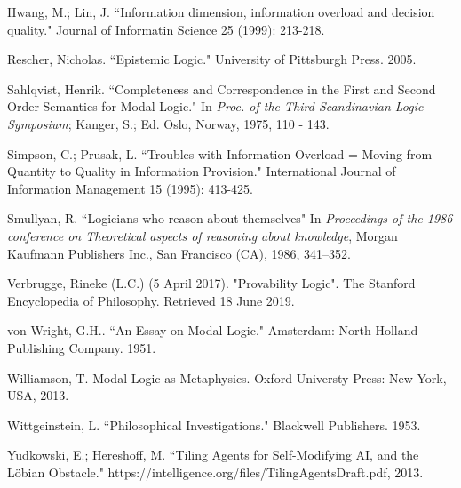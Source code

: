 \begin{thebibliography}{9}
	 	Hwang, M.; Lin, J. ``Information dimension, information overload and decision quality." Journal of Informatin Science 25 (1999): 213-218.
	 	
	 	Rescher, Nicholas. ``Epistemic Logic." University of Pittsburgh Press. 2005.
	 	
	 	Sahlqvist, Henrik. ``Completeness and Correspondence in the First and Second Order Semantics for Modal Logic." In {\em Proc. of the Third Scandinavian Logic Symposium}; Kanger, S.; Ed. Oslo, Norway, 1975, 110 - 143.
	 	
	 	Simpson, C.; Prusak, L. ``Troubles with Information Overload = Moving from Quantity to Quality in Information Provision." International Journal of Information Management 15 (1995): 413-425.
	 	
	 	Smullyan, R. ``Logicians who reason about themselves" In \emph{Proceedings of the 1986 conference on Theoretical aspects of reasoning about knowledge}, Morgan Kaufmann Publishers Inc., San Francisco (CA), 1986, 341–352.
	 	
	 	Verbrugge, Rineke (L.C.) (5 April 2017). "Provability Logic". The Stanford Encyclopedia of Philosophy. Retrieved 18 June 2019.
	 	
	 	von Wright, G.H.. ``An Essay on Modal Logic." Amsterdam: North-Holland Publishing Company. 1951.
	 	
	 	Williamson, T. Modal Logic as Metaphysics. Oxford Universty Press: New York, USA, 2013.
	 	
	 	Wittgeinstein, L. ``Philosophical Investigations." Blackwell Publishers. 1953.
	 	
		Yudkowski, E.; Hereshoff, M. ``Tiling Agents for Self-Modifying AI, and the L\"obian Obstacle." https://intelligence.org/files/TilingAgentsDraft.pdf, 2013.	 	
\end{thebibliography}
